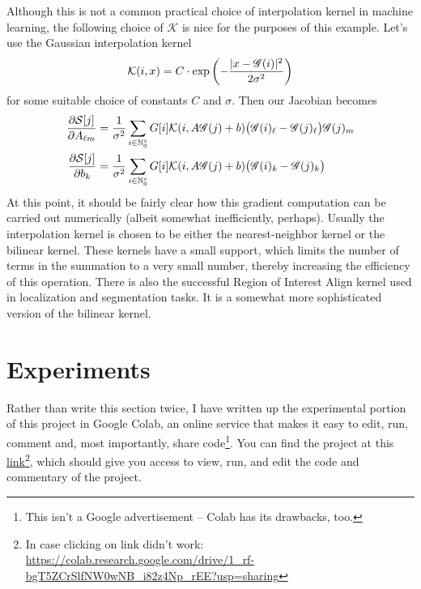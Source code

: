 \documentclass{article}
\newcommand{\Natural}{\mathbb{N}}
\begin{document}
	Although this is not a common practical choice of interpolation kernel in machine learning, the following choice of \(\mathcal{K}\) is nice for the purposes of this example. Let's use the Gaussian interpolation kernel
	\begin{equation*}
		\mathcal{K}(i, x) = C\cdot\mathrm{exp}\left(-\frac{|x - \mathscr{G}(i)|^2}{2\sigma^2}\right)
	\end{equation*}
	for some suitable choice of constants \(C\) and \(\sigma\). Then our Jacobian becomes
	\begin{align*}
		\frac{\partial \spatialtransf[j]}{\partial A_{\ell m}} &= \frac{1}{\sigma^2}\sum_{i \in \Natural_0^s} G[i]\mathcal{K}(i, A\grid(j) + b)\big(\grid(i)_\ell - \grid(j)_\ell\big)\grid(j)_m \\
		\frac{\partial \spatialtransf[j]}{\partial b_k} &=\frac{1}{\sigma^2}\sum_{i \in \Natural_0^s} G[i]\mathcal{K}(i, A\grid(j)+b)\big(\grid(i)_k - \grid(j)_k\big)
	\end{align*}
	At this point, it should be fairly clear how this gradient computation can be carried out numerically (albeit somewhat inefficiently, perhaps). Usually the interpolation kernel is chosen to be either the nearest-neighbor kernel or the bilinear kernel. These kernels have a small support, which limits the number of terms in the summation to a very small number, thereby increasing the efficiency of this operation. There is also the successful Region of Interest Align kernel used in localization and segmentation tasks. It is a somewhat more sophisticated version of the bilinear kernel.
	\section{Experiments}\label{sec:experiments}
	Rather than write this section twice, I have written up the experimental portion of this project in Google Colab, an online service that makes it easy to edit, run, comment and, most importantly, share code\footnote{This isn't a Google advertisement -- Colab has its drawbacks, too.}. You can find the project at this \href{https://colab.research.google.com/drive/1_rf-bgT5ZCrSlfNW0wNB_i82z4Np_rEE?usp=sharing}{link}\footnote{In case clicking on link didn't work: \url{https://colab.research.google.com/drive/1_rf-bgT5ZCrSlfNW0wNB_i82z4Np_rEE?usp=sharing}}, which should give you access to view, run, and edit the code and commentary of the project.
	\pagebreak
	
	
\end{document}
